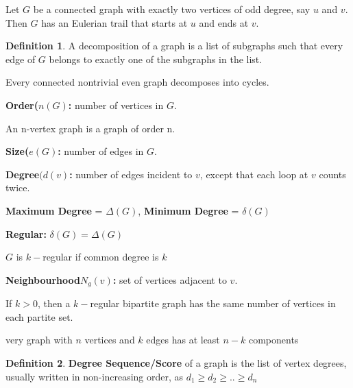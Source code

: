 \documentclass{article}
\theoremstyle{definition}
\newtheorem*{defi}{Definition}
\theoremstyle{definition}
\newenvironment{manualprop}[1]{%
  \renewcommand\themanualpropinner{#1}%
  \manualpropinner
}{\endmanualpropinner}
\newenvironment{manualcoro}[1]{%
  \renewcommand\themanualcoroinner{#1}%
  \manualcoroinner
}{\endmanualcoroinner}
\theoremstyle{named}
\begin{document}
\begin{manualcoro}{6.1}
    Let $G$ be a connected graph with exactly two vertices of odd
degree, say $u$ and $v$. Then $G$ has an Eulerian trail that starts at $u$ and ends
at $v$.
\end{manualcoro}

\begin{defi}
    A decomposition of a graph is a list of subgraphs such that every
edge of $G$ belongs to exactly one of the subgraphs in the list.
\end{defi}


\begin{manualcoro}{6.2}
Every connected nontrivial even graph decomposes into cycles.
\end{manualcoro}


\begin{citemize}
    \item \textbf{Order($n(G)$:} number of vertices in $G$.
    \item An n-vertex graph is a graph of order n.
    \item \textbf{Size($e(G)$:} number of edges in $G$.
    \item \textbf{Degree$(d(v)$:} number of edges incident to $v$, except that each loop at $v$ counts twice.
    \item \textbf{Maximum Degree} = $\Delta(G)$, \textbf{Minimum Degree} = $\delta(G)$
    \item \textbf{Regular:} $\delta(G) = \Delta(G)$
    \item $G$ is $k-$regular if common degree is $k$
    \item \textbf{Neighbourhood$N_g (v)$:} set of vertices adjacent to $v$.
\end{citemize}

\begin{manualprop}{34}
    If $k > 0$, then a $k-$regular bipartite graph has the same
number of vertices in each partite set.
\end{manualprop}

\begin{manualprop}
    Every graph with $n$ vertices and $k$
edges has at least $n-k$ components
\end{manualprop}

\begin{defi}
    \textbf{Degree Sequence/Score} of a graph is the list of vertex
degrees, usually written in non-increasing order, as $d_1 \geq d_2 \geq .. \geq d_n$
\end{defi}
\end{document}
